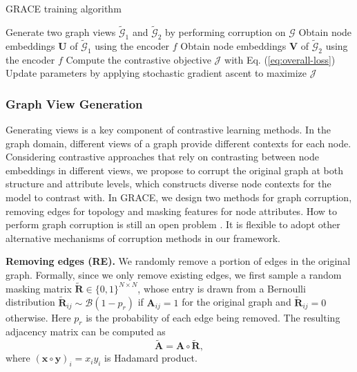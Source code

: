 \documentclass{article}
\theoremstyle{remark}
\begin{document}
\begin{algorithm}[ht]
	\DontPrintSemicolon\SetNoFillComment
	\caption{GRACE training algorithm}
	\label{algo:GRACE-training}
	 {
		Generate two graph views \(\widetilde{\mathcal{G}}_1\) and \(\widetilde{\mathcal{G}}_2\) by performing corruption on \(\mathcal{G}\)\;
		Obtain node embeddings \(\bm{U}\) of \(\widetilde{\mathcal{G}}_1\) using the encoder \(f\)\;
		Obtain node embeddings \(\bm{V}\) of \(\widetilde{\mathcal{G}}_2\) using the encoder \(f\)\;
		Compute the contrastive objective \(\mathcal{J}\) with Eq. (\ref{eq:overall-loss})\;
		Update parameters by applying stochastic gradient ascent to maximize \(\mathcal{J}\)\;
	}
\end{algorithm}

\subsubsection{Graph View Generation}
\label{sec:generate-views}
Generating views is a key component of contrastive learning methods. In the graph domain, different views of a graph provide different contexts for each node. Considering contrastive approaches that rely on contrasting between node embeddings in different views, we propose to corrupt the original graph at both structure and attribute levels, which constructs diverse node contexts for the model to contrast with.
In GRACE, we design two methods for graph corruption, removing edges for topology and masking features for node attributes.
How to perform graph corruption is still an open problem \cite{Velickovic:2019tu}. It is flexible to adopt other alternative mechanisms of corruption methods in our framework.





\textbf{Removing edges (RE). \quad}
We randomly remove a portion of edges in the original graph. Formally, since we only remove existing edges, we first sample a random masking matrix \(\widetilde{\bm{R}} \in \{ 0, 1 \}^{N \times N}\), whose entry is drawn from a Bernoulli distribution \(\widetilde{\bm{R}}_{ij} \sim \mathcal{B}(1 - p_r)\) if \(\bm{A}_{ij} = 1\) for the original graph and \(\widetilde{\bm{R}}_{ij} = 0\) otherwise. Here \(p_r\) is the probability of each edge being removed. The resulting adjacency matrix can be computed as
\begin{equation}
	\widetilde{\bm A} = \bm{A} \circ \widetilde{\bm{R}},
\end{equation}
where \((\bm{x} \circ \bm{y})_i = x_i y_i\) is Hadamard product.
\end{document}

